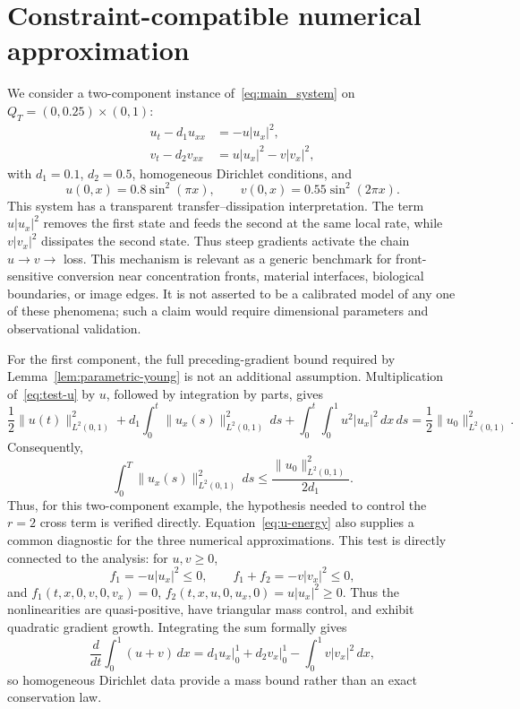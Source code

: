 \section{Constraint-compatible numerical approximation}
\label{sec:numerical}

We consider a two-component instance of~\eqref{eq:main_system} on $Q_T=(0,0.25)\times(0,1)$:
\begin{align}
 u_t-d_1u_{xx}&=-u|u_x|^2, \label{eq:test-u}\\
 v_t-d_2v_{xx}&=u|u_x|^2-v|v_x|^2, \label{eq:test-v}
\end{align}
with $d_1=0.1$, $d_2=0.5$, homogeneous Dirichlet conditions, and
\[
 u(0,x)=0.8\sin^2(\pi x),\qquad v(0,x)=0.55\sin^2(2\pi x).
\]
This system has a transparent transfer--dissipation interpretation. The term $u|u_x|^2$ removes the first state and feeds the second at the same local rate, while $v|v_x|^2$ dissipates the second state. Thus steep gradients activate the chain $u\to v\to$ loss. This mechanism is relevant as a generic benchmark for front-sensitive conversion near concentration fronts, material interfaces, biological boundaries, or image edges. It is not asserted to be a calibrated model of any one of these phenomena; such a claim would require dimensional parameters and observational validation.

For the first component, the full preceding-gradient bound required by Lemma~\ref{lem:parametric-young} is not an additional assumption. Multiplication of~\eqref{eq:test-u} by $u$, followed by integration by parts, gives
\begin{equation}
 \frac12\|u(t)\|_{L^2(0,1)}^2
 +d_1\int_0^t\!\|u_x(s)\|_{L^2(0,1)}^2\,ds
 +\int_0^t\!\int_0^1u^2|u_x|^2\,dx\,ds
 =\frac12\|u_0\|_{L^2(0,1)}^2.
 \label{eq:u-energy}
\end{equation}
Consequently,
\[
 \int_0^T\|u_x(s)\|_{L^2(0,1)}^2\,ds
 \le \frac{\|u_0\|_{L^2(0,1)}^2}{2d_1}.
\]
Thus, for this two-component example, the hypothesis needed to control the $r=2$ cross term is verified directly. Equation~\eqref{eq:u-energy} also supplies a common diagnostic for the three numerical approximations.
This test is directly connected to the analysis: for $u,v\ge0$,
\[
 f_1=-u|u_x|^2\le0,\qquad f_1+f_2=-v|v_x|^2\le0,
\]
and $f_1(t,x,0,v,0,v_x)=0$, $f_2(t,x,u,0,u_x,0)=u|u_x|^2\ge0$. Thus the nonlinearities are quasi-positive, have triangular mass control, and exhibit quadratic gradient growth. Integrating the sum formally gives
\[
 \frac{d}{dt}\int_0^1(u+v)\,dx
 =d_1u_x\big|_0^1+d_2v_x\big|_0^1-\int_0^1v|v_x|^2\,dx,
\]
so homogeneous Dirichlet data provide a mass bound rather than an exact conservation law.

